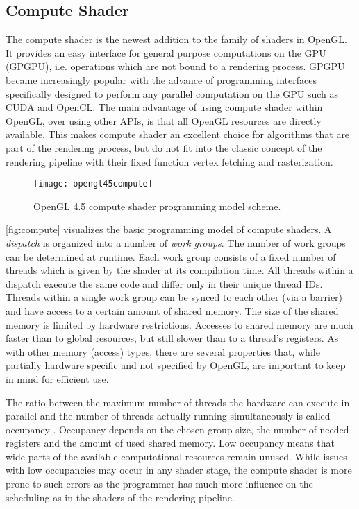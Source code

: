 \documentclass[thesis.tex]{subfiles}
\begin{document}
\subsection{Compute Shader} \label{sec:preq:compute}
The compute shader is the newest addition to the family of shaders in OpenGL.
It provides an easy interface for general purpose computations on the GPU (GPGPU), i.e. operations which are not bound to a rendering process.
GPGPU became increasingly popular with the advance of programming interfaces specifically designed to perform any parallel computation on the GPU such as CUDA and OpenCL.
The main advantage of using compute shader within OpenGL, over using other APIs, is that all OpenGL resources are directly available.
This makes compute shader an excellent choice for algorithms that are part of the rendering process, but do not fit into the classic concept of the rendering pipeline with their fixed function vertex fetching and rasterization.

\begin{figure}[h]
\centering
\texttt{[image: opengl45compute]}
\caption{\cite{bib:openglquickref} OpenGL 4.5 compute shader programming model scheme.}
\label{fig:compute}
\end{figure}
\autoref{fig:compute} visualizes the basic programming model of compute shaders.
A \emph{dispatch} is organized into a number of \emph{work groups}. 
The number of work groups can be determined at runtime. 
Each work group consists of a fixed number of threads which is given by the shader at its compilation time.
All threads within a dispatch execute the same code and differ only in their unique thread IDs.
Threads within a single work group can be synced to each other (via a barrier) and have access to a certain amount of shared memory.
The size of the shared memory is limited by hardware restrictions. 
Accesses to shared memory are much faster than to global resources, but still slower than to a thread's registers.
As with other memory (access) types, there are several properties that, while partially hardware specific and not specified by OpenGL, are important to keep in mind for efficient use.

The ratio between the maximum number of threads the hardware can execute in parallel and the number of threads actually running simultaneously is called occupancy \cite{bib:cudaprogguide, bib:amdoccupancy}.
Occupancy depends on the chosen group size, the number of needed registers and the amount of used shared memory.
Low occupancy means that wide parts of the available computational resources remain unused.
While issues with low occupancies may occur in any shader stage, the compute shader is more prone to such errors as the programmer has much more influence on the scheduling as in the shaders of the rendering pipeline.
\end{document}
